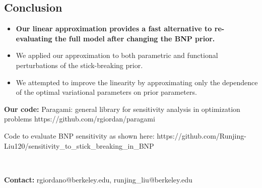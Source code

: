 \documentclass[a0,plainsections,30pt]{sciposter}\usepackage[]{graphicx}\usepackage[]{color}
\begin{document}
\begin{minipage}[t]{0.45\textwidth}
\begin{mdframed}[style=MyFrame]
\section*{Conclusion}
\vspace{-0.3in}

\begin{itemize}

\item {\bf Our linear approximation provides a fast alternative to re-evaluating the full model after changing the BNP prior. }

\item We applied our approximation to both parametric and functional perturbations of the stick-breaking prior.

\item We attempted to improve the linearity by approximating only the dependence of the optimal variational parameters on prior parameters.

\end{itemize}
\end{mdframed}

{\bf Our code: }\newline
Paragami: general library for sensitivity analysis in optimization problems\newline
{\color{blue} https://github.com/rgiordan/paragami}

Code to evaluate BNP sensitivity as shown here: \newline
{\color{blue} https://github.com/Runjing-Liu120/sensitivity\_to\_stick\_breaking\_in\_BNP}


\end{minipage}\\

\begin{center}

{\bf Contact: } rgiordano@berkeley.edu, runjing\_liu@berkeley.edu

\end{center}
\end{document}
